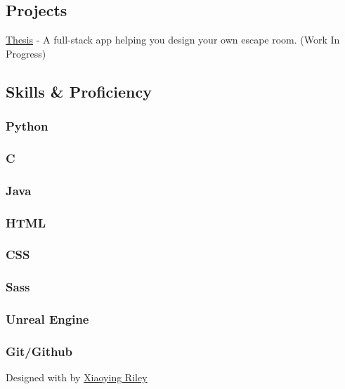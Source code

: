 \documentclass[english,]{article}
\begin{document}
\hypertarget{projects}{%
\subsection{\texorpdfstring{{ \emph{} \emph{} }
Projects}{    Projects}}\label{projects}}

{ \protect\hyperlink{hook}{Thesis} } - {A full-stack app helping you
design your own escape room. (Work In Progress)}

\hypertarget{skills-proficiency}{%
\subsection{\texorpdfstring{{ \emph{} \emph{} } Skills \&
Proficiency}{    Skills \& Proficiency}}\label{skills-proficiency}}

\hypertarget{python}{%
\subsubsection{Python}\label{python}}

\hypertarget{c}{%
\subsubsection{C}\label{c}}

\hypertarget{java}{%
\subsubsection{Java}\label{java}}

\hypertarget{html}{%
\subsubsection{HTML}\label{html}}

\hypertarget{css}{%
\subsubsection{CSS}\label{css}}

\hypertarget{sass}{%
\subsubsection{Sass}\label{sass}}

\hypertarget{unreal-engine}{%
\subsubsection{Unreal Engine}\label{unreal-engine}}

\hypertarget{gitgithub}{%
\subsubsection{Git/Github}\label{gitgithub}}

{Designed with \emph{} by \href{http://themes.3rdwavemedia.com}{Xiaoying
Riley}}
\end{document}
